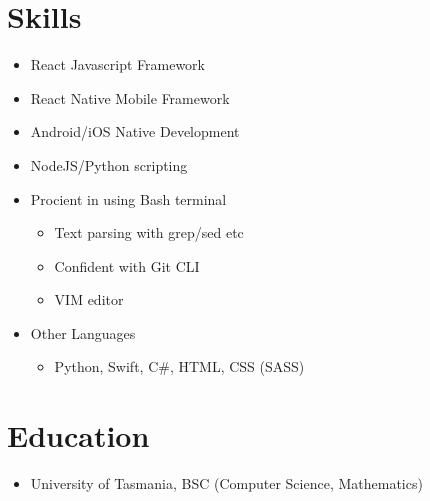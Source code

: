 \documentclass{article}
\begin{document}
\section{Skills}

\begin{itemize}
  \item React Javascript Framework
  \item React Native Mobile Framework
  \item Android/iOS Native Development
  \item NodeJS/Python scripting

  \item Procient in using Bash terminal
  \begin{itemize}
    \item Text parsing with grep/sed etc
    \item Confident with Git CLI
    \item VIM editor
  \end{itemize}

  \item Other Languages
  \begin{itemize}
    \item Python, Swift, C\#, HTML, CSS (SASS)
  \end{itemize}
\end{itemize}

\section{Education}
\begin{itemize}
  \item University of Tasmania, BSC (Computer Science, Mathematics)
\end{itemize}
\end{document}
